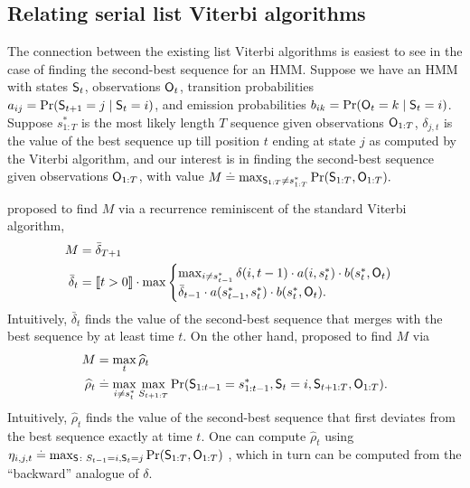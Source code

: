 %
\subsection{Relating serial list Viterbi algorithms}

The connection between the existing list Viterbi algorithms is easiest to see in the case of finding the second-best sequence for an HMM.
Suppose we have an HMM with states $\mathsf{S}_{t}$, observations $\mathsf{O}_{t}$, transition probabilities $a_{ij} = \Pr( \mathsf{S}_{t+1} = j \mid \mathsf{S}_t = i )$, and emission probabilities $b_{ik} = \Pr( \mathsf{O}_{t} = k \mid \mathsf{S}_t = i )$.
Suppose $s^*_{1:T}$ is the most likely length $T$ sequence given observations $\mathsf{O}_{1:T}$,
$\delta_{j, t}$ is the value of the best sequence up till position $t$ ending at state $j$ as computed by the Viterbi algorithm,
and our interest is in finding the second-best sequence given observations $\mathsf{O}_{1:T}$, with value
$ M \stackrel{.}{=} \max_{\mathsf{S}_{1:T} \neq s^*_{1 : T}}{\Pr( \mathsf{S}_{1:T}, \mathsf{O}_{1:T} )}. $

\citet{seshadri1994list} proposed to find $M$ via a recurrence reminiscent of the standard Viterbi algorithm,
\begin{equation}
    \label{eqn:att-recurrence}
    \begin{aligned}
        M &= \bar{\delta}_{T+1} \\
        \bar{\delta}_t &= 
        \indicator{t > 0} \cdot
        \max
        \begin{cases}
        \max_{i \neq s^*_{t-1}} \delta(i, t-1) \cdot a( i, s^*_{t} ) \cdot b( s^*_{t}, \OSf_{t} ) \\
        \bar{\delta}_{t - 1} \cdot a( s^*_{t - 1}, s^*_{t} ) \cdot b( s^*_{t}, \OSf_{t} ).
        \end{cases}%
    \end{aligned}    
\end{equation}
Intuitively, $\bar{\delta}_t$ finds the value of the second-best sequence that merges with the best sequence by at least time $t$.
On the other hand, \citet{nilsson2001sequentially} proposed to find $M$ via
\begin{align*}
	M &= \max_t \widehat{\rho}_t \\
	\widehat{\rho}_{t} &\stackrel{.}{=} \max_{i \neq s^*_{t}} \max_{S_{t+1:T}} {\Pr( \mathsf{S}_{1:t-1} = s^*_{1:t-1}, \mathsf{S}_t = i, \mathsf{S}_{t+1:T}, \mathsf{O}_{1:T} )}.
\end{align*}
Intuitively, $\widehat{\rho}_t$ finds the value of the second-best sequence that first deviates from the best sequence exactly at time $t$.
One can compute $\widehat{\rho}_{t}$ using $\eta_{i, j, t} \stackrel{.}{=} \max_{\mathsf{S} \colon S_{t - 1} = i, \mathsf{S}_{t} = j} \Pr( \mathsf{S}_{1:T}, \mathsf{O}_{1:T} )$ \citep{nilsson2001sequentially},
which in turn can be computed from the ``backward'' analogue of $\delta$.


